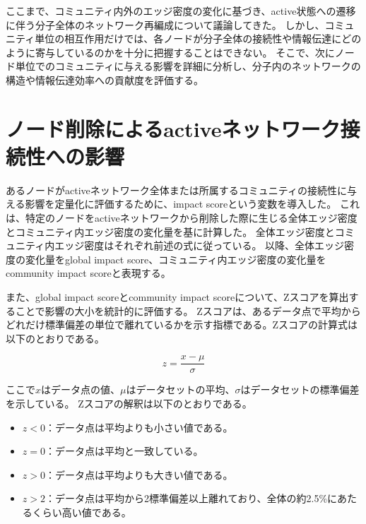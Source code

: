 ここまで、コミュニティ内外のエッジ密度の変化に基づき、active状態への遷移に伴う分子全体のネットワーク再編成について議論してきた。
しかし、コミュニティ単位の相互作用だけでは、各ノードが分子全体の接続性や情報伝達にどのように寄与しているのかを十分に把握することはできない。
そこで、次にノード単位でのコミュニティに与える影響を詳細に分析し、分子内のネットワークの構造や情報伝達効率への貢献度を評価する。


\section{ノード削除によるactiveネットワーク接続性への影響}

あるノードがactiveネットワーク全体または所属するコミュニティの接続性に与える影響を定量化に評価するために、impact scoreという変数を導入した。
これは、特定のノードをactiveネットワークから削除した際に生じる全体エッジ密度とコミュニティ内エッジ密度の変化量を基に計算した。
全体エッジ密度とコミュニティ内エッジ密度はそれぞれ前述の式に従っている。
以降、全体エッジ密度の変化量をglobal impact score、コミュニティ内エッジ密度の変化量をcommunity impact scoreと表現する。

また、global impact scoreとcommunity impact scoreについて、Zスコアを算出することで影響の大小を統計的に評価する。
Zスコアは、あるデータ点で平均からどれだけ標準偏差の単位で離れているかを示す指標である。Zスコアの計算式は以下のとおりである。

\begin{equation}
z = \frac{x - \mu}{\sigma}
\end{equation}

ここで$x$はデータ点の値、$\mu$はデータセットの平均、$\sigma$はデータセットの標準偏差を示している。
Zスコアの解釈は以下のとおりである。
\begin{itemize}
    \item \( z < 0 \)：データ点は平均よりも小さい値である。
    \item \( z = 0 \)：データ点は平均と一致している。
    \item \( z > 0 \)：データ点は平均よりも大きい値である。
    \item \( z > 2 \)：データ点は平均から2標準偏差以上離れており、全体の約2.5\%にあたるくらい高い値である。
\end{itemize}

